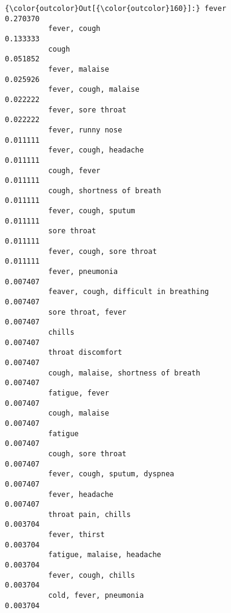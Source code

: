 \documentclass[11pt]{article}
\begin{document}
\begin{Verbatim}[commandchars=\\\{\}]
{\color{outcolor}Out[{\color{outcolor}160}]:} fever                                                          0.270370
          fever, cough                                                   0.133333
          cough                                                          0.051852
          fever, malaise                                                 0.025926
          fever, cough, malaise                                          0.022222
          fever, sore throat                                             0.022222
          fever, runny nose                                              0.011111
          fever, cough, headache                                         0.011111
          cough, fever                                                   0.011111
          cough, shortness of breath                                     0.011111
          fever, cough, sputum                                           0.011111
          sore throat                                                    0.011111
          fever, cough, sore throat                                      0.011111
          fever, pneumonia                                               0.007407
          feaver, cough, difficult in breathing                          0.007407
          sore throat, fever                                             0.007407
          chills                                                         0.007407
          throat discomfort                                              0.007407
          cough, malaise, shortness of breath                            0.007407
          fatigue, fever                                                 0.007407
          cough, malaise                                                 0.007407
          fatigue                                                        0.007407
          cough, sore throat                                             0.007407
          fever, cough, sputum, dyspnea                                  0.007407
          fever, headache                                                0.007407
          throat pain, chills                                            0.003704
          fever, thirst                                                  0.003704
          fatigue, malaise, headache                                     0.003704
          fever, cough, chills                                           0.003704
          cold, fever, pneumonia                                         0.003704

\end{Verbatim}
\end{document}
